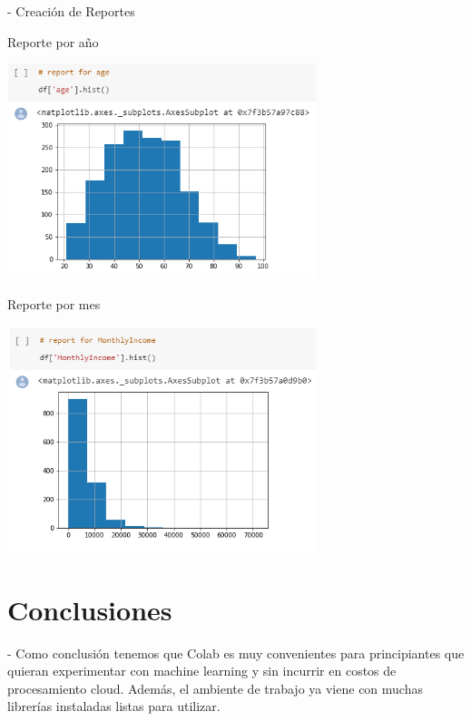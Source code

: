 \documentclass[12pt,letterpaper]{article}
\begin{document}
- Creaci\'on de Reportes

Reporte por a\~no

\begin{center}
\includegraphics[width=9cm]{IMG/10.png} 
\end{center}

Reporte por mes

\begin{center}
\includegraphics[width=9cm]{IMG/11.png} 
\end{center}

\section{Conclusiones} 

-	Como conclusi\'on tenemos que Colab es muy convenientes para principiantes que quieran experimentar con machine learning y  sin incurrir en costos de procesamiento cloud. Adem\'as, el ambiente de trabajo ya viene con muchas librer\'ias instaladas listas para utilizar.
\end{document}
